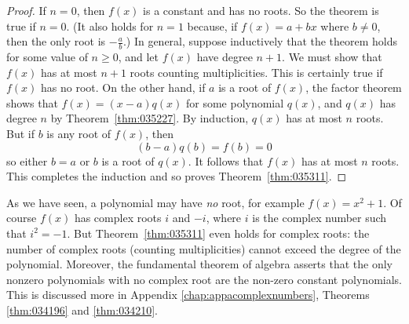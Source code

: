 \begin{proof}
If $n = 0$, then $f(x)$ is a constant and has no roots. So the theorem is true if $n = 0$. (It also holds for $n = 1$ because, if $f(x) = a + bx$ where $b \neq 0$, then the only root is $-\frac{a}{b}$.) In general, suppose inductively that the theorem holds for some value of $n \geq 0$, and let $f(x)$ have degree $n + 1$. We must show that $f(x)$ has at most $n + 1$ roots counting multiplicities. This is certainly true if $f(x)$ has no root. On the other hand, if $a$ is a root of $f(x)$, the factor theorem shows that $f(x) = (x - a) q(x)$ for some polynomial $q(x)$, and $q(x)$ has degree $n$ by Theorem~\ref{thm:035227}. By induction, $q(x)$ has at most $n$ roots. But if $b$ is any root of $f(x)$, then
\begin{equation*}
(b-a)q(b)=f(b)=0
\end{equation*}
so either $b = a$ or $b$ is a root of $q(x)$. It follows that $f(x)$ has at most $n$ roots. This completes the induction and so proves Theorem~\ref{thm:035311}.
\end{proof}

As we have seen, a polynomial may have \textit{no} root, for example $f(x) = x^{2} + 1$. Of course $f(x)$ has complex roots $i$ and $-i$, where $i$ is the complex number such that $i^{2} = -1$. But Theorem~\ref{thm:035311}
 even holds for complex roots: the number of complex roots (counting 
multiplicities) cannot exceed the degree of the polynomial. Moreover, 
the fundamental theorem of algebra asserts that the only nonzero 
polynomials with no complex root are the non-zero constant polynomials. 
This is discussed more in Appendix \ref{chap:appacomplexnumbers}, Theorems \ref{thm:034196} and \ref{thm:034210}.



